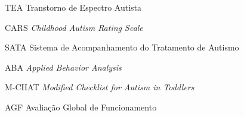\begin{siglas}
  \item[TEA] Transtorno de Espectro Autista
  \item[CARS] \emph{Childhood Autism Rating Scale}
  \item[SATA] Sistema de Acompanhamento do Tratamento de Autismo
  \item[ABA] \emph{Applied Behavior Analysis}
  \item[M-CHAT] \emph{Modified Checklist for Autism in Toddlers}
  \item[AGF] Avaliação Global de Funcionamento
\end{siglas}